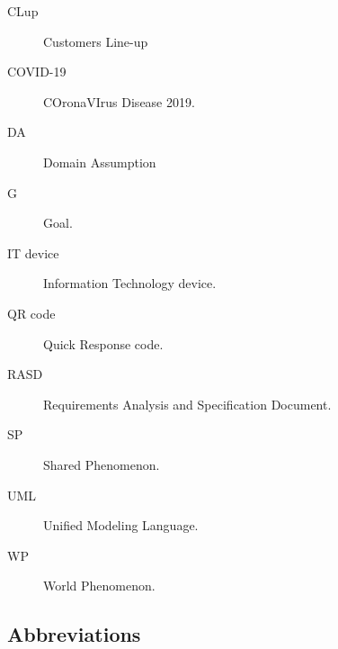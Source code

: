 \documentclass[../../main.tex]{subfiles}
\begin{document}
\begin{description}
    
    \item[CLup] Customers Line-up
    
    \item[COVID-19] COronaVIrus Disease 2019.
    
    \item[DA] Domain Assumption
    
    \item[G] Goal.
    
    \item[IT device] Information Technology device.
    
    \item[QR code] Quick Response code.
    
    \item[RASD] Requirements Analysis and Specification Document.
    
    \item[SP] Shared Phenomenon.
    
    \item[UML] Unified Modeling Language.
    
    \item[WP] World Phenomenon.
\end{description}

\subsection{Abbreviations}
\end{document}

